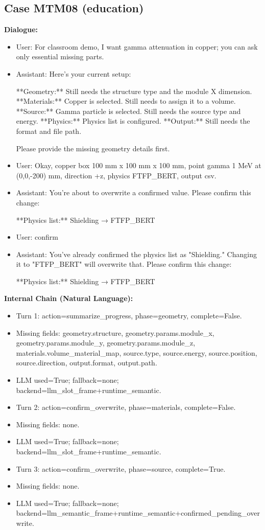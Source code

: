\documentclass[11pt]{ctexart}
\begin{document}
\subsection{Case MTM08 (education)}
\textbf{Dialogue:}
\begin{itemize}
\item User: For classroom demo, I want gamma attenuation in copper; you can ask only essential missing parts.
\item Assistant: Here's your current setup:

**Geometry:** Still needs the structure type and the module X dimension.
**Materials:** Copper is selected. Still needs to assign it to a volume.
**Source:** Gamma particle is selected. Still needs the source type and energy.
**Physics:** Physics list is configured.
**Output:** Still needs the format and file path.

Please provide the missing geometry details first.
\item User: Okay, copper box 100 mm x 100 mm x 100 mm, point gamma 1 MeV at (0,0,-200) mm, direction +z, physics FTFP\_BERT, output csv.
\item Assistant: You're about to overwrite a confirmed value. Please confirm this change:

**Physics list:** Shielding → FTFP\_BERT
\item User: confirm
\item Assistant: You've already confirmed the physics list as "Shielding." Changing it to "FTFP\_BERT" will overwrite that. Please confirm this change:

**Physics list:** Shielding → FTFP\_BERT
\end{itemize}
\textbf{Internal Chain (Natural Language):}
\begin{itemize}
\item Turn 1: action=summarize\_progress, phase=geometry, complete=False.
\item Missing fields: geometry.structure, geometry.params.module\_x, geometry.params.module\_y, geometry.params.module\_z, materials.volume\_material\_map, source.type, source.energy, source.position, source.direction, output.format, output.path.
\item LLM used=True; fallback=none; backend=llm\_slot\_frame+runtime\_semantic.
\item Turn 2: action=confirm\_overwrite, phase=materials, complete=False.
\item Missing fields: none.
\item LLM used=True; fallback=none; backend=llm\_slot\_frame+runtime\_semantic.
\item Turn 3: action=confirm\_overwrite, phase=source, complete=True.
\item Missing fields: none.
\item LLM used=True; fallback=none; backend=llm\_semantic\_frame+runtime\_semantic+confirmed\_pending\_overwrite.
\end{itemize}
\end{document}
